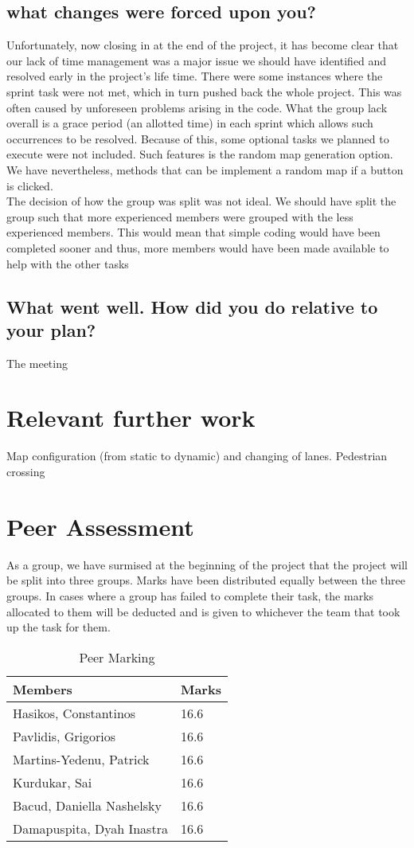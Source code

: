 \documentclass{article}[11pt,Tahoma]
\begin{document}
		\subsection{what changes were forced upon you? }
			Unfortunately, now closing in at the end of the project, it has become clear that our lack of time management was a major issue we should have identified and resolved early in the project's life time. There were some instances where the sprint task were not met, which in turn pushed back the whole project. This was often caused by  unforeseen problems arising in the code. What the group lack overall is a grace period (an allotted time) in each sprint which allows such occurrences to be resolved. Because of this, some optional tasks we planned to execute were not included. Such features is the random map generation option.  We have nevertheless, methods that can be implement a random map if a button is clicked. \\
			The decision of how the group was split was not ideal. We should have split the group such that more experienced members were grouped with the less experienced members.  This would mean that simple  coding would have been completed sooner and thus, more members would have been made available to help with the other tasks
		\subsection{What went well.  How did you do relative to your plan?}
		The meeting 	
	\section{Relevant further work}  
			Map configuration (from static to dynamic) and changing of lanes. Pedestrian crossing
	\section{Peer Assessment}
		As a group, we have surmised at the beginning of the project that the project will be split into three groups.  Marks have been distributed equally between the three groups. In cases where a group has failed to complete their task, the marks allocated to them will be deducted and is given to whichever the team that took up the task for them.
		\begin{table}[h]
		\centering
    			\begin{tabular}{|l|l|}
    				\hline
    				\textbf{Members}                   & \textbf{Marks} \\ \hline
    				Hasikos, Constantinos     & 16.6  \\ \hline
    				Pavlidis, Grigorios       & 16.6  \\ \hline
    				Martins-Yedenu, Patrick   & 16.6  \\ \hline
    				Kurdukar, Sai             & 16.6  \\ \hline
    				Bacud, Daniella Nashelsky & 16.6  \\ \hline
    				Damapuspita, Dyah Inastra & 16.6  \\ \hline
    			\end{tabular}
    			\caption {Peer Marking}
		\end{table}
\end{document}
